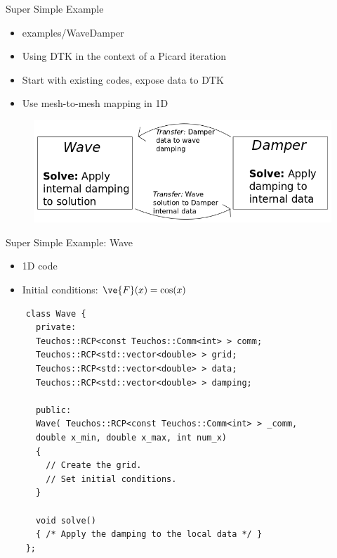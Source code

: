 \documentclass{beamer}
\begin{document}
\begin{frame}{Super Simple Example}

  \begin{itemize}
  \item examples/WaveDamper
    \medskip
  \item Using DTK in the context of a Picard iteration
    \medskip
  \item Start with existing codes, expose data to DTK
  \item Use mesh-to-mesh mapping in 1D
  \end{itemize}

  \begin{figure}
    \centering
    \includegraphics[width=4.5in]{wavedamperexample.png}
  \end{figure}

\end{frame}

\begin{frame}[fragile]{Super Simple Example: Wave}

  \begin{itemize}
  \item 1D code
  \item Initial conditions: $\ve{F}(x) = \cos(x)$
  \end{itemize}

  \begin{lstlisting}
    class Wave {
      private:
      Teuchos::RCP<const Teuchos::Comm<int> > comm;
      Teuchos::RCP<std::vector<double> > grid;
      Teuchos::RCP<std::vector<double> > data;
      Teuchos::RCP<std::vector<double> > damping;

      public:
      Wave( Teuchos::RCP<const Teuchos::Comm<int> > _comm,
      double x_min, double x_max, int num_x)
      {
        // Create the grid.
        // Set initial conditions.
      }

      void solve()
      { /* Apply the damping to the local data */ }
    };
  \end{lstlisting}

\end{frame}
\end{document}
